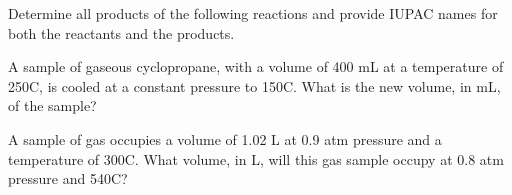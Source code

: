 \documentclass[addpoints, 12pt]{exam}
\begin{document}
\begin{questions}
\vspace{1cm}

\question[20] Determine all products of the following reactions
and provide IUPAC names for both the reactants and the products.
\begin{parts}
\part

\part 
\vspace{5cm}

\end{parts}
\vspace{5cm}






\question[10] A sample of gaseous cyclopropane, with a volume of 400 mL at a
temperature of 250C, is cooled at a constant pressure to 150C.  What
is the new volume, in mL, of the sample?
\vspace{2cm}


\question[10] A sample of  gas occupies a volume of 1.02 L at 0.9 atm
pressure and a temperature of 300C.  What volume, in L, will this gas
sample occupy at 0.8 atm pressure and 540C?




\end{questions}
\end{document}
